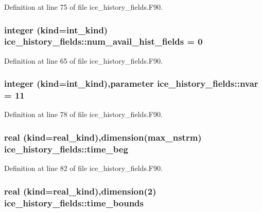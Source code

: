 Definition at line 75 of file ice\_\-history\_\-fields.F90.\hypertarget{namespaceice__history__fields_ae792c3e29c3220a23344fc57f0950944}{
\subsubsection[{num\_\-avail\_\-hist\_\-fields}]{\setlength{\rightskip}{0pt plus 5cm}integer (kind=int\_\-kind) {\bf ice\_\-history\_\-fields::num\_\-avail\_\-hist\_\-fields} = 0}}
\label{namespaceice__history__fields_ae792c3e29c3220a23344fc57f0950944}


Definition at line 65 of file ice\_\-history\_\-fields.F90.\hypertarget{namespaceice__history__fields_a36bf5fe8de5bdf3f0fa9bd6840536a96}{
\subsubsection[{nvar}]{\setlength{\rightskip}{0pt plus 5cm}integer (kind=int\_\-kind),parameter {\bf ice\_\-history\_\-fields::nvar} = 11}}
\label{namespaceice__history__fields_a36bf5fe8de5bdf3f0fa9bd6840536a96}


Definition at line 78 of file ice\_\-history\_\-fields.F90.\hypertarget{namespaceice__history__fields_af6acdcd2aad4d4b1e7de1048a0654b1b}{
\subsubsection[{time\_\-beg}]{\setlength{\rightskip}{0pt plus 5cm}real (kind=real\_\-kind),dimension(max\_\-nstrm) {\bf ice\_\-history\_\-fields::time\_\-beg}}}
\label{namespaceice__history__fields_af6acdcd2aad4d4b1e7de1048a0654b1b}


Definition at line 82 of file ice\_\-history\_\-fields.F90.\hypertarget{namespaceice__history__fields_af1a62dc90d229ad2a1f46e618e3903d3}{
\subsubsection[{time\_\-bounds}]{\setlength{\rightskip}{0pt plus 5cm}real (kind=real\_\-kind),dimension(2) {\bf ice\_\-history\_\-fields::time\_\-bounds}}}
\label{namespaceice__history__fields_af1a62dc90d229ad2a1f46e618e3903d3}


